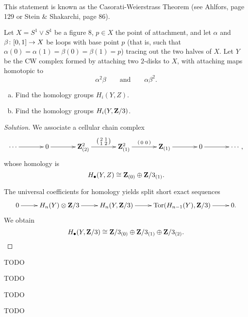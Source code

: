 \begin{remark}
  This statement is known as the Casorati-Weierstrass Theorem (see Ahlfors, page 129 or Stein \& Shakarchi, page 86).
\end{remark}


Let $X = S^1 \vee S^1$ be a figure $8$, $p \in X$ the point of attachment, and let $\alpha$ and $\beta \colon [0,1] \rightarrow X$ be loops with base point $p$ (that is, such that $\alpha(0) = \alpha(1) = \beta(0) = \beta(1) = p$) tracing out the two halves of $X$. Let $Y$ be the CW complex formed by attaching two $2$-disks to $X$, with attaching maps homotopic to
\[
\alpha^2 \beta \qquad\textrm{and}\qquad \alpha\beta^2.
\]
\begin{enumerate}[(a)]
\item Find the homology groups $H_i(Y,Z)$.
\item Find the homology groups $H_i(Y,\mathbf{Z}/3)$.
\end{enumerate}

\begin{proof}[Solution]
  We associate a cellular chain complex
  \[\xymatrix@C=0.5in{
    \cdots \ar[r] & 0 \ar[r] & \Z^2_{(2)} \ar[r]^-{\left(\begin{smallmatrix} 2 & 1 \\ 1 & 2 \end{smallmatrix}\right)} & \Z^2_{(1)} \ar[r]^-{\left(\begin{smallmatrix} 0 & 0 \end{smallmatrix}\right)} & \Z_{(1)} \ar[r] & 0 \ar[r] & \cdots,
  }\]
  whose homology is
  \[
  H_\bullet(Y,Z) \cong \mathbf{Z}_{(0)} \oplus \mathbf{Z}/3_{(1)}.
  \]
  
  The universal coefficients for homology yields split short exact sequences
  \[\xymatrix{
    0 \ar[r] & H_n(Y) \otimes \Z/3 \ar[r] & H_n(Y,\Z/3) \ar[r] & \Tor(H_{n-1}(Y),\Z/3) \ar[r] & 0.
  }\]
  We obtain
  \[
  H_\bullet(Y,\mathbf{Z}/3) \cong \mathbf{Z}/3_{(0)} \oplus \mathbf{Z}/3_{(1)} \oplus \mathbf{Z}/3_{(2)}. \qedhere
  \]
\end{proof}


TODO


TODO


TODO


TODO

